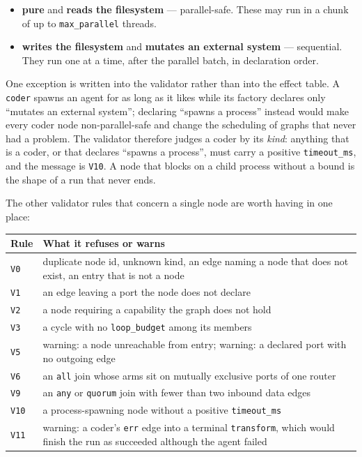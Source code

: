 \begin{itemize}
	\item \textbf{pure} and \textbf{reads the filesystem} --- parallel-safe. These may run in a
	chunk of up to \texttt{max\_parallel} threads.
	\item \textbf{writes the filesystem} and \textbf{mutates an external system} --- sequential. They
	run one at a time, after the parallel batch, in declaration order.
\end{itemize}

One exception is written into the validator rather than into the effect table. A \texttt{coder}
spawns an agent for as long as it likes while its factory declares only \enquote{mutates an external
system}; declaring \enquote{spawns a process} instead would make every coder node non-parallel-safe
and change the scheduling of graphs that never had a problem. The validator therefore judges a coder
by its \emph{kind}: anything that is a coder, or that declares \enquote{spawns a process}, must
carry a positive \texttt{timeout\_ms}, and the message is \texttt{V10}. A node that blocks on a
child process without a bound is the shape of a run that never ends.

The other validator rules that concern a single node are worth having in one place:

\begin{center}
\footnotesize
\begin{tabular}{@{}p{}p{}@{}}
	\toprule
	\textbf{Rule} & \textbf{What it refuses or warns} \\
	\midrule
	\texttt{V0} & duplicate node id, unknown kind, an edge naming a node that does not exist, an
	entry that is not a node \\
	\texttt{V1} & an edge leaving a port the node does not declare \\
	\texttt{V2} & a node requiring a capability the graph does not hold \\
	\texttt{V3} & a cycle with no \texttt{loop\_budget} among its members \\
	\texttt{V5} & warning: a node unreachable from entry; warning: a declared port with no outgoing
	edge \\
	\texttt{V6} & an \texttt{all} join whose arms sit on mutually exclusive ports of one router \\
	\texttt{V9} & an \texttt{any} or \texttt{quorum} join with fewer than two inbound data edges \\
	\texttt{V10} & a process-spawning node without a positive \texttt{timeout\_ms} \\
	\texttt{V11} & warning: a coder's \texttt{err} edge into a terminal \texttt{transform}, which
	would finish the run as succeeded although the agent failed \\
	\bottomrule
\end{tabular}
\end{center}

